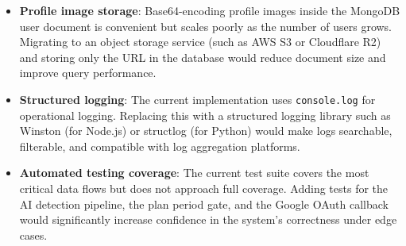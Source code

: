 \documentclass[12pt, a4paper]{report}
\begin{document}
\begin{itemize}
    \item \textbf{Profile image storage}: Base64-encoding profile images inside the MongoDB user document is convenient but scales poorly as the number of users grows. Migrating to an object storage service (such as AWS S3 or Cloudflare R2) and storing only the URL in the database would reduce document size and improve query performance.
    \item \textbf{Structured logging}: The current implementation uses \texttt{console.log} for operational logging. Replacing this with a structured logging library such as Winston (for Node.js) or structlog (for Python) would make logs searchable, filterable, and compatible with log aggregation platforms.
    \item \textbf{Automated testing coverage}: The current test suite covers the most critical data flows but does not approach full coverage. Adding tests for the AI detection pipeline, the plan period gate, and the Google OAuth callback would significantly increase confidence in the system's correctness under edge cases.
\end{itemize}
\end{document}
